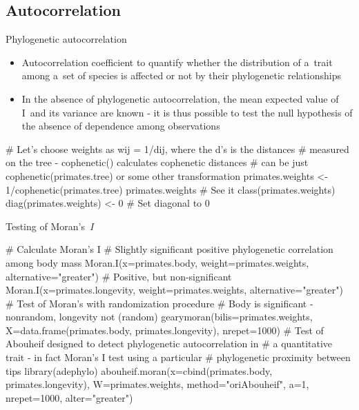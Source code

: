 \documentclass[compress, ucs, xelatex, 11pt, xcolor=svgnames,
  hyperref={
    bookmarks=true,
    unicode=true,
    colorlinks=true,
    pdftitle={Molecular data in R},
    plainpages=false,
    pdfauthor={Vojtech Zeisek},
    pdfsubject={Course about phylogeny and evolution in R},
    pdfcreator={XeLaTeX},
    pdfkeywords={R, evolution, phylogeny, molecular data},
    linkcolor=Tomato,
    anchorcolor=SaddleBrown,
    citecolor=Goldenrod,
    filecolor=DarkMagenta,
    menucolor=Sienna,
    urlcolor=DarkTurquoise,
    pdftex},
  url={hyphens, lowtilde} %
  ]{beamer}
\begin{document}
\subsection{Autocorrelation}

\begin{frame}[fragile]{Phylogenetic autocorrelation}
\begin{itemize}
 \item Autocorrelation coefficient to quantify whether the distribution of a~trait among a~set of species is affected or not by their phylogenetic relationships
 \item In the absence of phylogenetic autocorrelation, the mean expected value of I~and its variance are known - it is thus possible to test the null hypothesis of the absence of dependence among observations
\end{itemize}
  \begin{spluscode}
    # Let's choose weights as wij = 1/dij, where the d’s is the distances
    # measured on the tree - cophenetic() calculates cophenetic distances
    # can be just cophenetic(primates.tree) or some other transformation
    primates.weights <- 1/cophenetic(primates.tree)
    primates.weights # See it
    class(primates.weights)
    diag(primates.weights) <- 0 # Set diagonal to 0
\end{spluscode}
\end{frame}

\begin{frame}[fragile]{Testing of Moran's~\textit{I}}
  \begin{spluscode}
    # Calculate Moran's I
    # Slightly significant positive phylogenetic correlation among body mass
    Moran.I(x=primates.body, weight=primates.weights,
      alternative="greater")
    # Positive, but non-significant
    Moran.I(x=primates.longevity, weight=primates.weights,
      alternative="greater")
    # Test of Moran's with randomization procedure
    # Body is significant - nonrandom, longevity not (random)
    gearymoran(bilis=primates.weights, X=data.frame(primates.body,
      primates.longevity), nrepet=1000)
    # Test of Abouheif designed to detect phylogenetic autocorrelation in
    # a quantitative trait - in fact Moran's I test using a particular
    # phylogenetic proximity between tips
    library(adephylo)
    abouheif.moran(x=cbind(primates.body, primates.longevity),
      W=primates.weights, method="oriAbouheif", a=1, nrepet=1000,
      alter="greater")
  \end{spluscode}
\end{frame}
\end{document}
